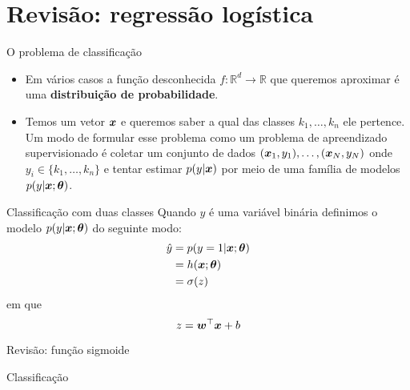 \documentclass[10pt]{beamer}
\begin{document}
\nocite{DeepLearningbook}

\maketitle

\section{Revisão: regressão logística}

\begin{frame}{O problema de classificação}

\begin{itemize}
\item [] Em vários casos a função desconhecida $f:\mathbb{R}^{d} \rightarrow \mathbb{R}$ que queremos aproximar é uma \textbf{distribuição de probabilidade}.
\vspace{0.3cm}
\item[] Temos um vetor $\bm{x}$ e queremos saber a qual das classes $k_1, \dots, k_n$ ele pertence. Um modo de formular esse problema como um problema de apreendizado supervisionado é coletar um conjunto de dados $(\bm{x}_{1}, y_{1}), \dots ,(\bm{x}_{N}, y_{N})$ onde $y_i \in \{k_1, \dots, k_n\}$ e tentar estimar $p(y  | \bm{x})$ por meio de uma família de modelos $p(y | \bm{x}; \bm{\theta})$.
\end{itemize}
\end{frame}


\begin{frame}{Classificação com duas classes}
Quando $y$ é uma variável binária definimos o modelo $p(y | \bm{x}; \bm{\theta})$ do seguinte modo:
\Large{
\begin{align*}
\hat{y} &= p(y=1| \bm{x}; \bm{\theta})\\
&= h(\bm{x}; \bm{\theta}) \\
&= \sigma(z)\\
\end{align*}
}
em que 
\begin{equation*}
z = {\bm{w}}^{\top}{\bm{x}} + b
\end{equation*}

\end{frame}

\begin{frame}[fragile]{Revisão: função sigmoide}

\end{frame}

\begin{frame}{Classificação}

\end{frame}
\end{document}
